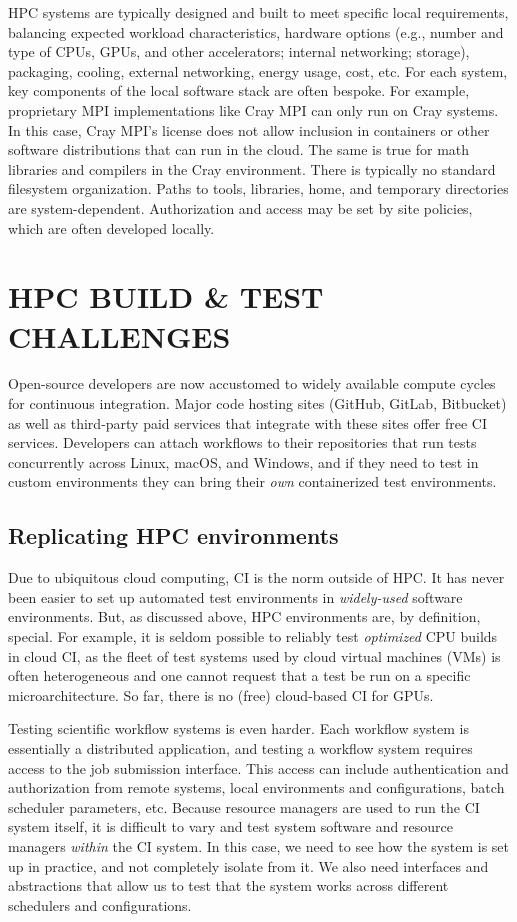 \documentclass{IEEEcsmag}
\begin{document}
HPC systems are typically designed and built to meet specific local requirements, balancing
expected workload characteristics, hardware options (e.g., number and type of CPUs, GPUs,
and other accelerators; internal networking; storage), packaging, cooling, external networking,
energy usage, cost, etc.
For each system, key components of the local software stack are often bespoke.
For example, proprietary MPI implementations like Cray MPI can only run
on Cray systems. In this case, Cray MPI's license does not allow inclusion in
containers or other software distributions that can run in the cloud. The same is true
for math libraries and compilers in the Cray environment. There is typically no
standard filesystem organization.  Paths to tools, libraries, home, and
temporary directories are system-dependent.
Authorization and access may be set by site policies, which are often developed locally.



\section{HPC BUILD \& TEST CHALLENGES}

Open-source developers are now accustomed to widely available compute cycles for
continuous integration. Major code hosting sites
(GitHub, GitLab, Bitbucket) as well as third-party paid services that integrate with
these sites offer free CI services. Developers can attach workflows to their repositories that run tests
concurrently across Linux, macOS, and Windows, and if they need to test in
custom environments they can bring their {\it own} containerized test environments.

\subsection{Replicating HPC environments}

Due to ubiquitous cloud computing, CI is the norm outside of HPC. It has never been
easier to set up automated test environments in {\it widely-used} software environments.
But, as discussed above, HPC environments are, by definition, special.
For example, it is seldom possible to reliably test {\it optimized} CPU builds in
cloud CI, as the fleet of test systems used by cloud virtual machines (VMs) is often heterogeneous and one
cannot request that a test be run on a specific microarchitecture. So far, there is no (free) cloud-based
CI for GPUs.

Testing scientific workflow systems is even harder. Each workflow system is essentially
a distributed application, and testing a workflow system requires access to the job
submission interface. This access can include authentication and authorization from
remote systems, local environments and configurations, batch scheduler parameters, etc.
Because resource managers are used to run the CI system itself, it is
difficult to vary and test system software and resource managers {\it within} the CI system. In
this case, we need to see how the system is set up in practice, and not completely
isolate from it. We also need interfaces and abstractions that allow us to test
that the system works across different schedulers and configurations.
\end{document}
